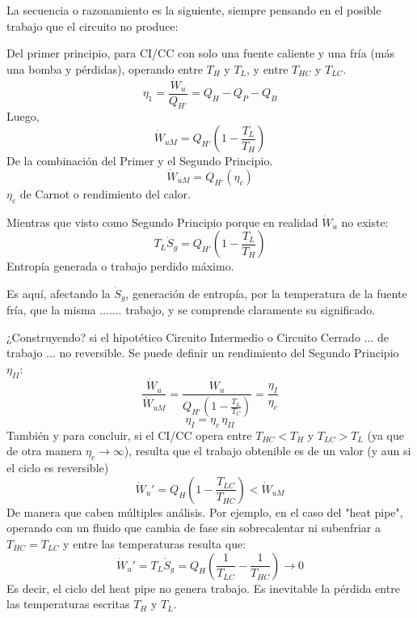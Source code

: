 \documentclass{article}
\begin{document}
La secuencia o razonamiento es la siguiente, siempre pensando en el posible trabajo que el circuito no produce:

Del primer principio, para CI/CC con solo una fuente caliente y una fría (más una bomba y pérdidas), operando entre $T_H$ y $T_L$, y entre $T_{HC}$ y $T_{LC}$.
\begin{equation}
\eta_1=\frac{\dot{W}_u}{Q_{H'}}=Q_H-Q_P-Q_B 
\end{equation}
Luego,
\begin{equation}
\dot{W}_{uM}=Q_{H'}\left(1-\frac{T_L}{T_H}\right)
\end{equation}
De la combinación del Primer y el Segundo Principio.
\begin{equation}
\dot{W}_{uM}=Q_{H'}\left(\eta_c\right)
\end{equation}
$\eta_c$ de Carnot o rendimiento del calor.

Mientras que visto como Segundo Principio porque en realidad $\dot{W}_u$ no existe:
\begin{equation}
    T_L\dot{S}_g = Q_{H'}\left(1-\frac{T_L}{T_H}\right)
\end{equation}
Entropía generada o trabajo perdido máximo.

Es aquí, afectando la $\dot{S}_g$, generación de entropía, por la temperatura de la fuente fría, que la misma ....... trabajo, y se comprende claramente su significado.

¿Construyendo? si el hipotético Circuito Intermedio o Circuito Cerrado ... de trabajo ... no reversible. Se puede definir un rendimiento del Segundo Principio $\eta_{II}$:
\begin{equation}
    \frac{\dot{W}_u}{\dot{W}_{uM}}=\frac{\dot{W}_u}{Q_{H'}\left(1-\frac{T_L}{T_C}\right)}=\frac{\eta_I}{\eta_c}
\end{equation}
\begin{equation}
    \eta_I=\eta_c\,\eta_{II}
\end{equation}
También y para concluir, si el CI/CC opera entre $T_{HC}<T_{H}$ y $T_{LC}>T_{L}$  (ya que de otra manera $\eta_c\xrightarrow{}\infty$), resulta que el trabajo obtenible es de un valor (y aun si el ciclo es reversible)
\begin{equation}
    \dot{W}_u'=Q_H\left(1-\frac{T_{LC}}{T_{HC}}\right)<\dot{W}_{uM}
\end{equation}
De manera que caben múltiples análisis. Por ejemplo, en el caso del "heat pipe", operando con un fluido que cambia de fase sin sobrecalentar ni subenfriar a $T_{HC}=T_{LC}$ y entre las temperaturas resulta que:
\begin{equation}
    \dot{W}_u'=T_L\dot{S}_g=Q_H\left(\frac{1}{T_{LC}}-\frac{1}{T_{HC}}\right)\xrightarrow{}0
\end{equation}
Es decir, el ciclo del heat pipe no genera trabajo. Es inevitable la pérdida entre las temperaturas escritas $T_H$ y $T_L$.
\end{document}
